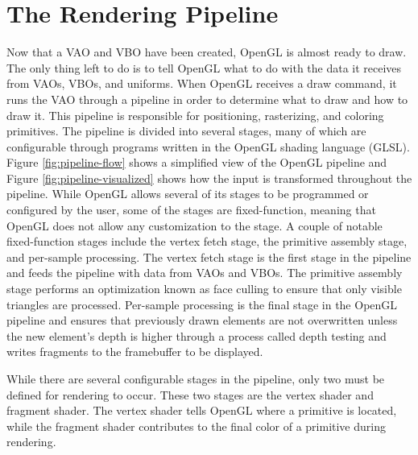 \documentclass{article}
\begin{document}
\section{The Rendering Pipeline}
Now that a VAO and VBO have been created, OpenGL is almost ready to draw. The only thing left to do is to tell OpenGL what to do with the data it receives from VAOs, VBOs, and uniforms. When OpenGL receives a draw command, it runs the VAO through a pipeline in order to determine what to draw and how to draw it. This pipeline is responsible for positioning, rasterizing, and coloring primitives. The pipeline is divided into several stages, many of which are configurable through programs written in the OpenGL shading language (GLSL). Figure \ref{fig:pipeline-flow} shows a simplified view of the OpenGL pipeline and Figure \ref{fig:pipeline-visualized} shows how the input is transformed throughout the pipeline. While OpenGL allows several of its stages to be programmed or configured by the user, some of the stages are fixed-function, meaning that OpenGL does not allow any customization to the stage. A couple of notable fixed-function stages include the vertex fetch stage, the primitive assembly stage, and per-sample processing. The vertex fetch stage is the first stage in the pipeline and feeds the pipeline with data from VAOs and VBOs. The primitive assembly stage performs an optimization known as face culling to ensure that only visible triangles are processed. Per-sample processing is the final stage in the OpenGL pipeline and ensures that previously drawn elements are not overwritten unless the new element's depth is higher through a process called depth testing and writes fragments to the framebuffer to be displayed. %

While there are several configurable stages in the pipeline, only two must be defined for rendering to occur. These two stages are the vertex shader and fragment shader. The vertex shader tells OpenGL where a primitive is located, while the fragment shader contributes to the final color of a primitive during rendering.
\end{document}
